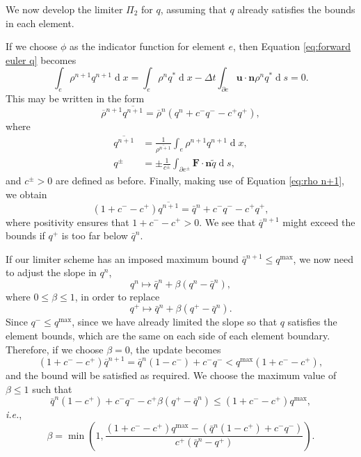 \documentclass{article}
\def\MM#1{\boldsymbol{#1}}
\def\MM#1{\boldsymbol{#1}}
\DeclareMathOperator{\diff}{d}
\begin{document}
We now develop the limiter $\Pi_2$ for $q$, assuming that $q$ already
satisfies the bounds in each element.

If we choose $\phi$ as the indicator function for element $e$, then
Equation \eqref{eq:forward euler q} becomes
\begin{equation}
\int_e \rho^{n+1} q^{n+1}\diff x 
= \int_e \rho^n q^*\diff x 
- \Delta t\int_{\partial e} \MM{u}\cdot\MM{n} 
\rho^nq^* \diff s = 0.
\end{equation}
This may be written in the form
\begin{equation}
\overline{\rho}^{n+1}\overline{q^{n+1}}
= \overline{\rho}^n\left(q^n + c^-q^- - c^+q^+\right),
\end{equation}
where
\begin{align}
\overline{q^{n+1}} & = \frac{1}{\overline{\rho^{n+1}}}\int_e
\rho^{n+1}q^{n+1}\diff x, \\
q^{\pm} & = \pm\frac{1}{c^{\pm}}\int_{\partial e^{\pm}}
\MM{F}\cdot\MM{n}\tilde{q}\diff s,
\end{align}
and $c^\pm>0$ are defined as before. Finally, making use
of Equation \eqref{eq:rho n+1}, we obtain
\begin{equation}
(1+ c^- - c^+)\overline{q^{n+1}}
= \bar{q}^n + c^-q^- - c^+q^+,
\end{equation}
where positivity ensures that $1+c^--c^+>0$. We see that
$\overline{q}^{n+1}$ might exceed the bounds if $q^+$ is too far below
$\bar{q}^n$.

If our limiter scheme has an imposed maximum bound $\bar{q}^{n+1}
\leq q^{\max}$, we now need to adjust the slope in $q^n$,
\begin{equation}
q^n \mapsto \bar{q}^n + \beta(q^n - \bar{q}^n),
\end{equation}
where $0\leq \beta \leq 1$, in order to replace
\begin{equation}
q^+ \mapsto \bar{q}^n + \beta(q^+-\bar{q}^n).
\end{equation}
Since $q^-\leq q^{\max}$, since we have already limited the slope so
that $q$ satisfies the element bounds, which are the same on each side
of each element boundary. Therefore, if we choose $\beta=0$, the update 
becomes
\begin{equation}
(1+ c^- - c^+)\overline{q}^{n+1}
= \bar{q}^n(1-c^-) + c^-q^- < q^{\max}(1 + c^- - c^+),
\end{equation}
and the bound will be satisfied as required. We choose the maximum
value of $\beta\leq 1$ such that
\begin{equation}
\bar{q}^n(1-c^+) + c^-q^- - c^+\beta(q^+-\bar{q}^n)
\leq (1+ c^- - c^+)q^{\max},
\end{equation}
\emph{i.e.},
\begin{equation}
\beta = \min\left(1,
 \frac{(1+ c^- - c^+)q^{\max} 
- \left(\bar{q}^n(1-c^+) + c^-q^- \right)}
{c^+(\bar{q}^n-{q}^+)}\right).
\end{equation}


\end{document}
